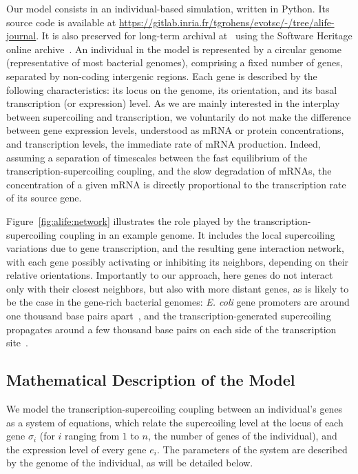 Our model consists in an individual-based simulation, written in Python.
Its source code is available at \url{https://gitlab.inria.fr/tgrohens/evotsc/-/tree/alife-journal}.
It is also preserved for long-term archival at~\citep{evotsc_swh} using the Software Heritage online archive~\citep{dicosmo2020}.
An individual in the model is represented by a circular genome (representative of most bacterial genomes), comprising a fixed number of genes, separated by non-coding intergenic regions.
Each gene is described by the following characteristics: its locus on the genome, its orientation, and its basal transcription (or expression) level.
As we are mainly interested in the interplay between supercoiling and transcription, we voluntarily do not make the difference between gene expression levels, understood as mRNA or protein concentrations, and transcription levels, the immediate rate of mRNA
production.
Indeed, assuming a separation of timescales between the fast equilibrium of the transcription-supercoiling coupling, and the slow degradation of mRNAs, the concentration of a given mRNA is directly proportional to the transcription rate of its source gene.

Figure~\ref{fig:alife:network} illustrates the role played by the transcription-supercoiling coupling in an example genome.
It includes the local supercoiling variations due to gene transcription, and the resulting gene interaction network, with each gene possibly activating or inhibiting its neighbors, depending on their relative orientations.
Importantly to our approach, here genes do not interact only with their closest neighbors, but also with more distant genes, as is likely to be the case in the gene-rich bacterial genomes: \emph{E. coli} gene promoters are around one thousand base pairs apart~\citep{peter2004}, and the transcription-generated supercoiling propagates around a few thousand base pairs on each side of the transcription site~\citep{postow2004}.


\subsection{Mathematical Description of the Model}

We model the transcription-supercoiling coupling between an individual's genes as a system of equations, which relate the supercoiling level at the locus of each gene $\sigma_i$ (for $i$ ranging from $1$ to $n$, the number of genes of the individual), and the expression level of every gene $e_i$.
The parameters of the system are described by the genome of the individual, as will be detailed below.


